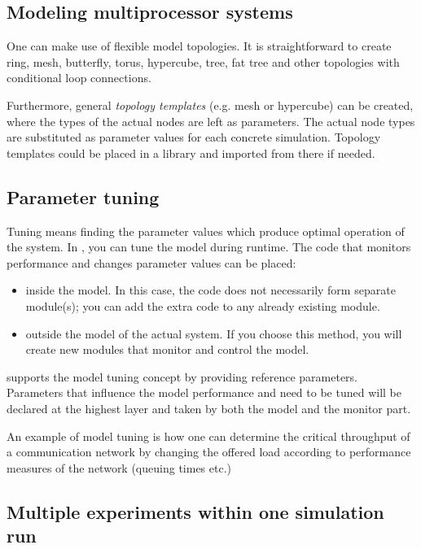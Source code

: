 \subsection{Modeling multiprocessor systems}

One can make use of flexible model topologies. It is straightforward
to create ring, mesh, butterfly, torus, hypercube, tree, fat tree and
other topologies with conditional loop
connections.


Furthermore, general \textit{topology
  templates} (e.g. mesh or hypercube) can be
created, where the types of the actual nodes are left as parameters.
The actual node types are substituted as parameter values for each
concrete simulation. Topology templates could be placed in a library
and imported from there if needed.





\subsection{Parameter tuning}

Tuning means finding the parameter values which produce optimal
operation of the system. In {\opp}, you can tune the model during
runtime. The code that monitors performance and changes parameter
values can be placed:
\begin{itemize}
\item{inside the model. In this case, the code does not necessarily
    form separate module(s); you can add the extra code to any already
    existing module.}
\item{outside the model of the actual system. If you choose this
    method, you will create new modules that monitor and control the
    model.}
\end{itemize}

{\opp} supports the model tuning concept by
providing reference parameters. Parameters that influence the model
performance and need to be tuned will be declared at the highest layer
and taken by both the model and the monitor part.


An example of model tuning is how one can determine the critical
throughput of a communication network by changing the offered
load according to performance measures of the network (queuing
times etc.)





\subsection{Multiple experiments within one simulation run}


